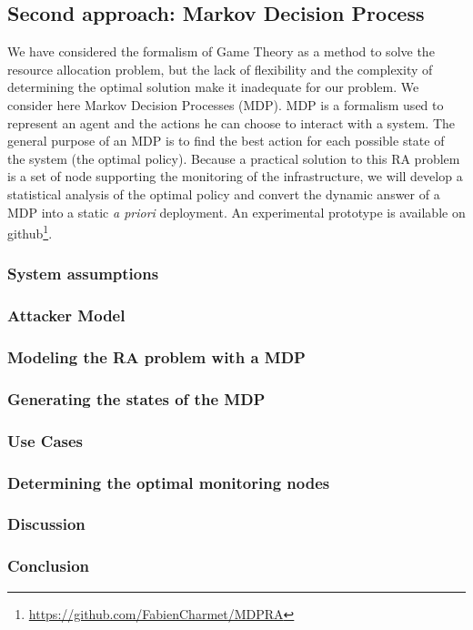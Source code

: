 \subsection{Second approach: Markov Decision Process}
We have considered the formalism of Game Theory as a method to solve the resource allocation problem, but the lack of flexibility and the complexity of determining the optimal solution make it inadequate for our problem. We consider here Markov Decision Processes (MDP).
MDP is a formalism used to represent an agent and the actions he can choose to interact with a system. The general purpose of an MDP is to find the best action for each possible state of the system (\ie the optimal policy). Because a practical solution to this RA problem is a set of node supporting the monitoring of the infrastructure, we will develop a statistical analysis of the optimal policy and convert the dynamic answer of a MDP into a static \textit{a priori} deployment.
An experimental prototype is available on github\footnote{\label{github}\url{https://github.com/FabienCharmet/MDPRA}}.


% 



\subsubsection{System assumptions}


\subsubsection{Attacker Model}


\subsubsection{Modeling the RA problem with a MDP}


\newpage
\subsubsection{Generating the states of the MDP}
 

\newpage
\subsubsection{Use Cases}


\subsubsection{Determining the optimal monitoring nodes}


\subsubsection{Discussion}


\subsubsection{Conclusion}
